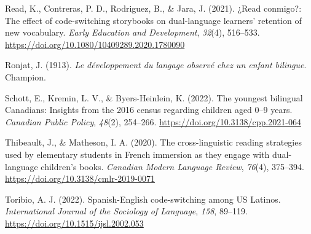 \documentclass[
  man,floatsintext]{apa7}
\newlength{\cslhangindent}
\newlength{\cslentryspacingunit} %
\newenvironment{CSLReferences}[2] %
 {%
  \setlength{\parindent}{0pt}
  \ifodd #1
  \let\oldpar\par
  \def\par{\hangindent=\cslhangindent\oldpar}
  \fi
  \setlength{\parskip}{#2\cslentryspacingunit}
 }%
 {}
\begin{document}
\begin{CSLReferences}{1}{0}
\leavevmode{}%
Read, K., Contreras, P. D., Rodriguez, B., \& Jara, J. (2021). ¿Read conmigo?: The effect of code-switching storybooks on dual-language learners' retention of new vocabulary. \emph{Early Education and Development}, \emph{32}(4), 516--533. \url{https://doi.org/10.1080/10409289.2020.1780090}

\leavevmode{}%
Ronjat, J. (1913). \emph{Le développement du langage observé chez un enfant bilingue}. Champion.

\leavevmode{}%
Schott, E., Kremin, L. V., \& Byers-Heinlein, K. (2022). The youngest bilingual {Canadians}: Insights from the 2016 census regarding children aged 0--9 years. \emph{Canadian Public Policy}, \emph{48}(2), 254--266. \url{https://doi.org/10.3138/cpp.2021-064}

\leavevmode{}%
Thibeault, J., \& Matheson, I. A. (2020). The cross-linguistic reading strategies used by elementary students in {French} immersion as they engage with dual-language children's books. \emph{Canadian Modern Language Review}, \emph{76}(4), 375--394. \url{https://doi.org/10.3138/cmlr-2019-0071}

\leavevmode{}%
Toribio, A. J. (2022). {Spanish-English} code-switching among {US Latinos}. \emph{International Journal of the Sociology of Language}, \emph{158}, 89--119. \url{https://doi.org/10.1515/ijsl.2002.053}

\end{CSLReferences}

\endgroup
\end{document}
